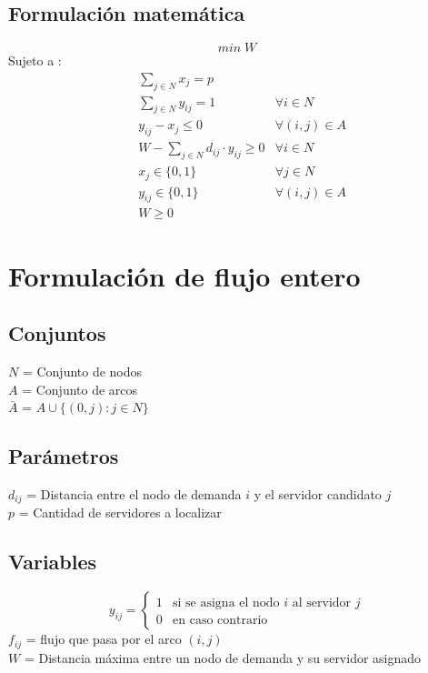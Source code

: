\documentclass{article}
\numberwithin{equation}{section}
\begin{document}
\subsection{Formulación matemática}
\begin{equation}
min \; W
\end{equation}
Sujeto a : \begin{align}
& \sum_{j \in N} x_{j} = p \\
& \sum_{j \in N} y_{ij} = 1 &\forall i \in N \\
& y_{ij} - x_{j} \leq 0 &\forall (i,j) \in A \\
& W - \sum_{j \in N} d_{ij} \cdot y_{ij} \geq 0 &\forall i \in N\\
& x_{j} \in \{0,1\} &\forall j \in N\\
& y_{ij} \in \{0,1\} &\forall (i,j) \in A\\
& W \geq 0
\end{align}

\newpage
\section{Formulación de flujo entero}
\subsection{Conjuntos}
$N$ = Conjunto de nodos\\
$A$ = Conjunto de arcos\\
$\bar{A}$ = $A \cup \{(0,j):j \in N\} $
\subsection{Parámetros}
$d_{ij}$ = Distancia entre el nodo de demanda $i$ y el servidor candidato $j$\\
$p$ = Cantidad de servidores a localizar
\subsection{Variables}
\begin{center}
\[y_{ij}={\begin{cases}1&{\mbox{si se asigna el nodo $i$ al servidor $j$}}\\0&{\mbox{en caso contrario}}\end{cases}}
\]
$f_{ij}$ = flujo que pasa por el arco $(i,j)$\\
$W$ = Distancia máxima entre un nodo de demanda y su servidor asignado
\end{center}
\end{document}
